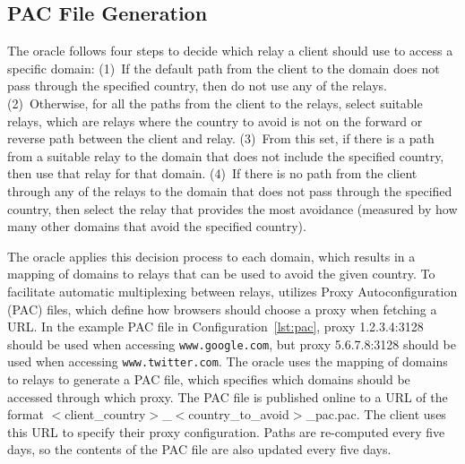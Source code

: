 

\subsection{PAC File Generation}
\label{multiplex}
The oracle follows four steps to decide which relay a client should
use to access a specific domain: (1)~If the default path from the
client to the domain does not pass through the specified country, then
do not use any of the relays.  (2)~Otherwise, for all the paths from
the client to the relays, select suitable relays, which are relays where the country 
to avoid is not on the forward or reverse path between the client and 
relay.  (3)~From this set, if there
is a path from a suitable relay to the domain that does not include
the specified country, then use that relay for that domain.  (4)~If
there is no path from the client through any of the relays to the
domain that does not pass through the specified country, then select
the relay that provides the most avoidance (measured by how many other
domains that avoid the specified country).
\begin{figure}[t]
\renewcommand{\lstlistingname}{Configuration}

\vspace*{-0.25in}
\end{figure}
The oracle applies this decision process to each domain, which results
in a mapping of domains to relays that can be used to avoid the given
country.  To facilitate automatic multiplexing between relays,
\system{} utilizes Proxy Autoconfiguration (PAC) files, which define
how browsers should choose a proxy when fetching a URL.  In the
example PAC file in Configuration~\ref{lst:pac}, proxy 1.2.3.4:3128
should be used when accessing {\tt www.google.com}, but proxy
5.6.7.8:3128 should be used when accessing {\tt www.twitter.com}.  The
oracle uses the mapping of domains to relays to generate a PAC file,
which specifies which domains should be accessed through which proxy.
The PAC file is published online to a URL of the format
$<$client\_country$>$\_$<$country\_to\_avoid$>$\_pac.pac.  The client
uses this URL to specify their proxy configuration.  Paths are
re-computed every five days, so the contents of the PAC file are also
updated every five days.

